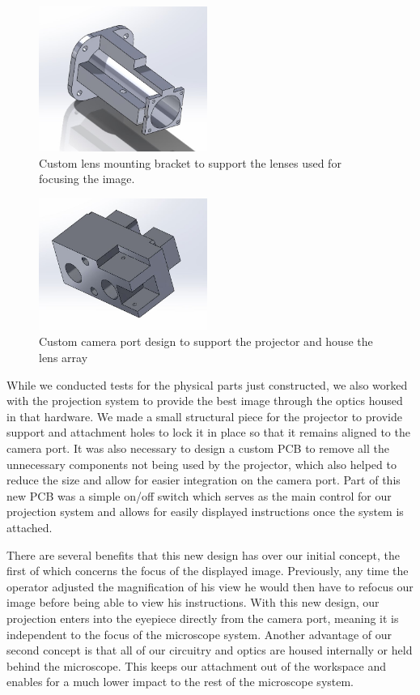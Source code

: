 \documentclass[12pt,a4paper]{article}
\begin{document}
\begin{appendices}
\begin{figure}[h!]
	\centering
	\includegraphics[width = 0.49\textwidth]{pics/lens_housing.jpg}
	\caption[Lens Housing Model]{\centering Custom lens mounting bracket to support the lenses used for focusing the image.}
	\label{LHM}
\end{figure}
\vfill
\begin{figure}[h!]
	\centering
	\includegraphics[width = 0.49\textwidth]{pics/camera_port.jpg}
	\caption[Camera Port Model]{\centering Custom camera port design to support the projector and house the lens array}
	\label{CPM}
\end{figure}

While we conducted tests for the physical parts just constructed, we also worked with the projection system to provide the best image through the optics housed in that hardware.  We made a small structural piece for the projector to provide support and attachment holes to lock it in place so that it remains aligned to the camera port. It was also necessary to design a custom PCB to remove all the unnecessary components not being used by the projector, which also helped to reduce the size and allow for easier integration on the camera port.  Part of this new PCB was a simple on/off switch which serves as the main control for our projection system and allows for easily displayed instructions once the system is attached.

There are several benefits that this new design has over our initial concept, the first of which concerns the focus of the displayed image.  Previously, any time the operator adjusted the magnification of his view he would then have to refocus our image before being able to view his instructions.  With this new design, our projection enters into the eyepiece directly from the camera port, meaning it is independent to the focus of the microscope system. Another advantage of our second concept is that all of our circuitry and optics are housed internally or held behind the microscope.  This keeps our attachment out of the workspace and enables for a much lower impact to the rest of the microscope system.



\end{appendices}
\end{document}
